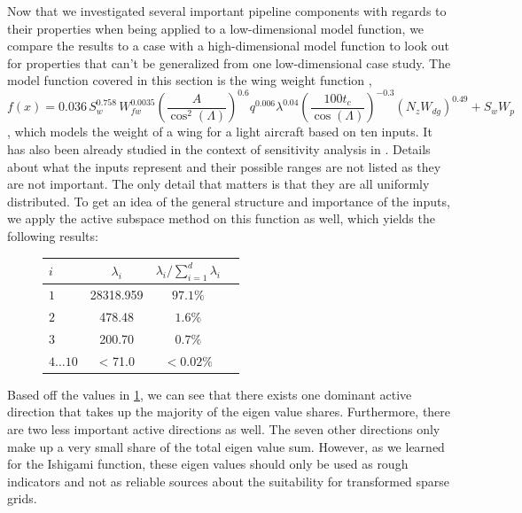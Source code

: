 \documentclass[
  a4paper,  %
  twoside,  %
  bibliography=totoc,
  headsepline,
  cleardoublepage=empty,
  parskip=half,
  draft=false
]{scrbook}
\begin{document}
Now that we investigated several important pipeline components with regards to their properties when being applied to a low-dimensional model function, we compare the results to a case with a high-dimensional model function to look out for properties that can't be generalized from one low-dimensional case study.
The model function covered in this section is the wing weight function \cite{Forrester2008},
\begin{equation}
f(x)=0.036 \, S_w^{0.758} \, W_{fw}^{0.0035} \left(\frac{A}{\cos^2(\Lambda)}\right)^{0.6} q^{0.006} \lambda^{0.04} \left( \frac{100 t_c}{\cos(\Lambda)} \right)^{-0.3} (N_z W_{dg})^{0.49} + S_w W_p
\end{equation}
, which models the weight of a wing for a light aircraft based on ten inputs.
It has also been already studied in the context of sensitivity analysis in \cite{Moon2012}.
Details about what the inputs represent and their possible ranges are not listed as they are not important.
The only detail that matters is that they are all uniformly distributed.
To get an idea of the general structure and importance of the inputs, we apply the active subspace method on this function as well, which yields the following results:

\begin{mdframed}[style=style]
\begin{figure}[H]
\centering

\bgroup
\def\arraystretch{1.2}%
  \begin{tabular}{ l | c c c}
$i$ & $\lambda_i$ & $\lambda_i / \sum_{i=1}^d \lambda_i$\\
\hline
$1$  & 28318.959 & $97.1\%$\\
$2$   & 478.48 & $1.6\%$\\
$3$  & 200.70 & $0.7\%$\\
$4 \dots 10$  & < 71.0 & $< 0.02\%$\\
\end{tabular}
\egroup
\vspace{0.5em}

\delimit

\label{tab:ww_as}
\end{figure}
\end{mdframed}
%
Based off the values in \cref{tab:ww_as}, we can see that there exists one dominant active direction that takes up the majority of the eigen value shares.
Furthermore, there are two less important active directions as well.
The seven other directions only make up a very small share of the total eigen value sum.
However, as we learned for the Ishigami function, these eigen values should only be used as rough indicators and not as reliable sources about the suitability for transformed sparse grids.
\end{document}
